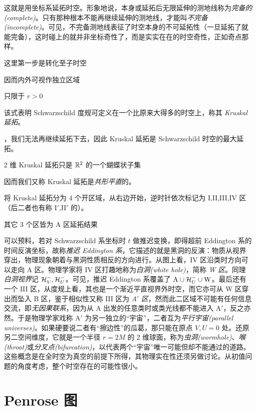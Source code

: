 这就是用坐标系延拓时空。形象地说，本身或延拓后无限延伸的测地线称为\textit{完备的(complete)}。只有那种根本不能再继续延伸的测地线，才能叫\textit{不完备(incomplete)}。可见，不完备测地线表征了时空本身的不可延拓性（一旦延拓了就能完备），这时碰上的就并非坐标奇性了，而是实实在在的时空奇性，正如奇点那样。




这里第一步是转化至子时空



因而内外可视作独立区域

只限于 $r>0$


该式表明 Schwarzschild 度规可定义在一个比原来大得多的时空上，称其 \textit{Kruskal 延拓}。

，我们无法再继续延拓下去，因此 Kruskal 延拓是 Schwarzschild 时空的最大延拓。

2 维 Kruskal 延拓只是 $\mathbb{R}^2$ 的一个蝴蝶状子集



因而我们又称 Kruskal 延拓是\textit{共形平直}的。



将 Kruskal 延拓分为 4 个开区域，从右边开始，逆时针依次标记为 I,II,III,IV 区（后二者也有称 I$'$,II$'$ 的）。



其它 3 个区皆为 A 区延拓结果



可以预料，若对 Schwarzschild 系坐标时 $t$ 做推迟变换，即得超前 Eddington 系的时间反演坐标，故称\textit{推迟 Eddington 系}，它描述的就是黑洞的反演：物质从视界穿出，物理现象朝着与黑洞性质相反的方向进行。从图上看，IV 区沿类时方向可以走向 A 区。物理学家将 IV 区打趣地称为\textit{白洞(white hole)}，简称 \textit{W 区}。同理\textit{白洞视界}记 $\mathcal{H}_V^-,\mathcal{H}_U^-$。可见，推迟 Eddington 系覆盖了 $\mathrm{A}\cup\mathcal{H}_U^-\cup\mathrm{W}$。最后还有一个 III 区，从度规上看，其也是一个渐近平直视界外时空，而它亦可从 W 区穿出而坠入 B 区，鉴于相似性又称 III 区为 \textit{A$'$ 区}，然而此二区域不可能有任何信息交流，即\textit{无因果联系}，因为从 A 出发的任意类时或类光线都不能进入 A$'$，反之亦然。于是物理学家戏称 A$'$ 为另一独立的“宇宙”，二者互为\textit{平行宇宙(parallel universes)}。如果硬要说二者有“擦边性”的瓜葛，那只能在原点 $V,U=0$ 处。还原另二空间维度，它就是一个半径 $r=2M$ 的 2 维球面，称为\textit{虫洞(wormhole)}、\textit{喉(throat)}或\textit{分叉点(bifurcation)}，以代表两个“宇宙”唯一可能但却不能通过的道路。这些概念是在全时空为真空的前提下所得，其物理实在性还须另做讨论。从初值问题的角度考虑，整个时空存在的可能性很小。

\section{Penrose 图}

